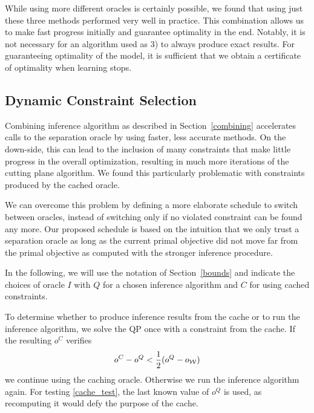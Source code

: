 While using more different oracles is certainly possible, we found
that using just these three methods performed very well in practice.  This
combination allows us to make fast progress initially and guarantee optimality
in the end.
Notably, it is not necessary for an algorithm used as 3) to always produce
exact results. For guaranteeing optimality of the model, it is sufficient that
we obtain a certificate of optimality when learning stops.

\subsection{Dynamic Constraint Selection}\label{caching}
Combining inference algorithm as described in Section~\ref{combining}
accelerates calls to the separation oracle by using faster, less accurate
methods. On the down-side, this can lead to the inclusion of many constraints
that make little progress in the overall optimization, resulting in much more
iterations of the cutting plane algorithm. We found this particularly problematic
with constraints produced by the cached oracle.

We can overcome this problem by defining a more elaborate schedule to switch
between oracles, instead of switching only if no violated constraint can be
found any more. Our proposed schedule is based on the intuition that we only
trust a separation oracle as long as the current primal objective did not move
far from the primal objective as computed with the stronger inference
procedure.


In the following, we will use the notation of Section~\ref{bounds} and indicate
the choices of oracle $I$ with $Q$ for a chosen inference algorithm and $C$ for
using cached constraints.

To determine whether to produce inference results from the cache or to run the inference algorithm,
we solve the QP once with a constraint from the cache. If the resulting $o^C$ verifies
\begin{equation}\label{eq:cache_test}
    o^C - o^Q < \frac{1}{2} (o^Q - o_{\mathcal{W}})
\end{equation}
we continue using the caching oracle. Otherwise we run the inference algorithm again.
For testing \eqref{cache_test}, the last known value of $o^Q$ is used, as recomputing it would defy
the purpose of the cache.

